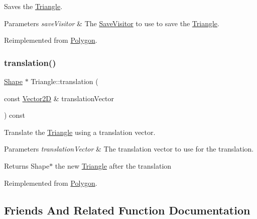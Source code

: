 Saves the \hyperlink{class_triangle}{Triangle}. 
\begin{DoxyParams}{Parameters}
{\em save\+Visitor} & The \hyperlink{class_save_visitor}{Save\+Visitor} to use to save the \hyperlink{class_triangle}{Triangle}. \\
\hline
\end{DoxyParams}


Reimplemented from \hyperlink{class_polygon_ad9adb867821b71e1aa8130dccbc9b37f}{Polygon}.

\hypertarget{class_triangle_ac66208b0b633add41b915860f051cf44}{}\label{class_triangle_ac66208b0b633add41b915860f051cf44} 
\subsubsection{\texorpdfstring{translation()}{translation()}}
{\footnotesize\ttfamily \hyperlink{class_shape}{Shape} $\ast$ Triangle\+::translation (\begin{DoxyParamCaption}\item[{const \hyperlink{class_vector2_d}{Vector2D} \&}]{translation\+Vector }\end{DoxyParamCaption}) const\hspace{0.3cm}{\ttfamily [virtual]}}

Translate the \hyperlink{class_triangle}{Triangle} using a translation vector. 
\begin{DoxyParams}{Parameters}
{\em translation\+Vector} & The translation vector to use for the translation. \\
\hline
\end{DoxyParams}
\begin{DoxyReturn}{Returns}
Shape$\ast$ the new \hyperlink{class_triangle}{Triangle} after the translation 
\end{DoxyReturn}


Reimplemented from \hyperlink{class_polygon_ae828addfa5cffab547bcb16db1f275be}{Polygon}.



\subsection{Friends And Related Function Documentation}
\hypertarget{class_triangle_a187347fa130a0bf0bf713db5afe3ee4b}{}\label{class_triangle_a187347fa130a0bf0bf713db5afe3ee4b} 
